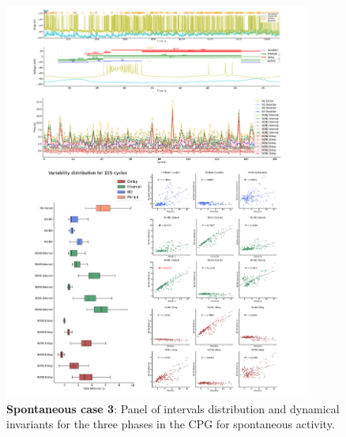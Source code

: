 \begin{figure}[htbp]
	\centering
	\includegraphics[width=0.9\textwidth]{./invariants/data/SUSSEX/prep1/images/3phases/panel_with_intervals.pdf}
	\caption{\textbf{Spontaneous case 3}: Panel of intervals distribution and dynamical invariants for the three phases in the CPG for spontaneous activity.}
	\label{fig:prep1 invariants}
\end{figure}



%


